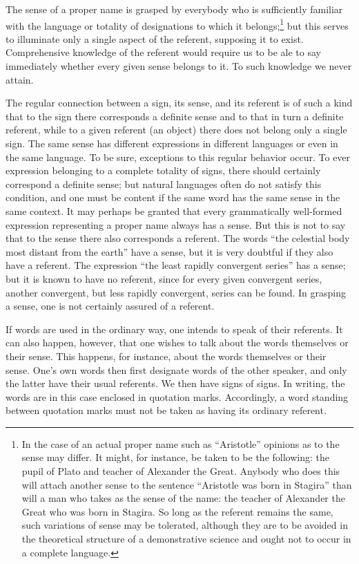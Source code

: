 \documentclass[twoside,12pt,a4paper]{article}
\begin{document}
The sense of a proper name is grasped by everybody who is sufficiently
familiar with the language or totality of designations to which it
belongs;\footnote[2]{In the case of an actual proper name such as
  ``Aristotle'' opinions as to the sense may differ. It might, for
  instance, be taken to be the following: the pupil of Plato and
  teacher of Alexander the Great. Anybody who does this will attach
  another sense to the sentence ``Aristotle was born in Stagira'' than
  will a man who takes as the sense of the name: the teacher of
  Alexander the Great who was born in Stagira. So long as the referent
  remains the same, such variations of sense may be tolerated,
  although they are to be avoided in the theoretical structure of a
  demonstrative science and ought not to occur in a complete
  language.} but this serves to illuminate only a single aspect of the
referent, supposing it to exist. Comprehensive knowledge of the
referent would require us to be ale to say immediately whether every
given sense belongs to it. To such knowledge we never attain.

The regular connection between a sign, its sense, and its referent is
of such a kind that to the sign there corresponds a definite sense and
to that in turn a definite referent, while to a given referent (an
object) there does not belong only a single sign. The same sense has
different expressions in different languages or even in the same
language. To be sure, exceptions to this regular behavior occur. To
ever expression belonging to a complete totality of signs, there
should certainly correspond a definite sense; but natural languages
often do  not satisfy this condition, and one must be
content if the same word has the same sense in the same context. It
may perhaps be granted that every grammatically well-formed expression
representing a proper name always has a sense. But this is not to say
that to the sense there also corresponds a referent. The words ``the
celestial body most distant from the earth'' have a sense, but it is
very doubtful if they also have a referent. The expression ``the least
rapidly convergent series'' has a sense; but it is known to have no
referent, since for every given convergent series, another convergent,
but less rapidly convergent, series can be found. In grasping a sense,
one is not certainly assured of a referent.

If words are used in the ordinary way, one intends to speak of their
referents. It can also happen, however, that one wishes to talk about
the words themselves or their sense. This happens, for instance, about
the words themselves or their sense. One's own words then first
designate words of the other speaker, and only the latter have their
usual referents. We then have signs of signs. In writing, the words
are in this case enclosed in quotation marks. Accordingly, a word
standing between quotation marks must not be taken as having its
ordinary referent.
\end{document}
